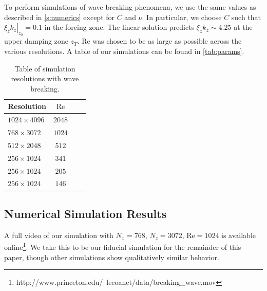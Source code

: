 \documentclass[
        fleqn,
        usenatbib,
        referee,
    ]{mnras}
\newcommand*{\at}[1]{\left.#1\right|}
\begin{document}

To perform simulations of wave breaking phenomena, we use the same values as
described in \autoref{s:numerics} except for $C$ and $\nu$. In particular, we
choose $C$ such that $\at{\xi_z k_z}_{z_0} = 0.1$ in the forcing zone. The
linear solution predicts $\xi_z k_z \sim 4.25$ at the upper damping zone $z_T$.
$\mathrm{Re}$ was chosen to be as large as possible across the various
resolutions. A table of our simulations can be found in \autoref{tab:params}.
\begin{table}
    \centering
    \begin{tabular}{l c c c}
        Resolution & $\mathrm{Re}$\\\bottomrule
        $1024 \times 4096$ & $2048$\\
        $768 \times 3072$ & $1024$\\
        $512 \times 2048$ & $512$\\
        $256 \times 1024$ & $341$\\
        $256 \times 1024$ & $205$\\
        $256 \times 1024$ & $146$\\
    \end{tabular}
    \caption{Table of simulation resolutions with wave
    breaking.}\label{tab:params}
\end{table}

\subsection{Numerical Simulation Results}\label{ss:nl_ns}

A full video of our simulation with $N_x = 768$, $N_z = 3072$, $\mathrm{Re} =
1024$ is available
online\footnote{http://www.princeton.edu/~lecoanet/data/breaking\_wave.mov}. We
take this to be our fiducial simulation for the remainder of this paper, though
other simulations show qualitatively similar behavior.
\end{document}

